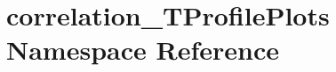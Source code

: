 \hypertarget{namespacecorrelation__TProfilePlots}{
\section{correlation\_\-TProfilePlots Namespace Reference}
\label{namespacecorrelation__TProfilePlots}
}

